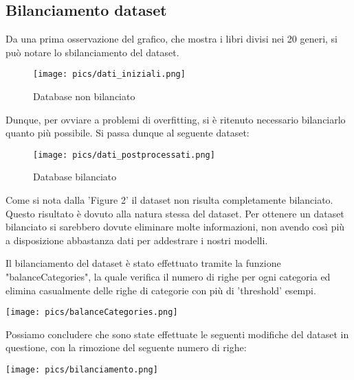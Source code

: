 \documentclass[12pt,oneside]{article}
\begin{document}
    \newpage
    \begin{enumerate}
    \subsection{Bilanciamento dataset}\label{bil}
    \begin{justify}
    Da una prima osservazione del grafico, che mostra i libri divisi nei 20 generi, si può notare lo sbilanciamento del dataset. 
    \end{justify}
    
    \begin{figure}[H]
    \texttt{[image: pics/dati\_iniziali.png]}
    \caption{Database non bilanciato}
    \end{figure}
    
    \begin{justify}
    Dunque, per ovviare a problemi di overfitting, si è ritenuto necessario bilanciarlo quanto più possibile. Si passa dunque al seguente dataset:
    \end{justify}
    
    \begin{figure}[H]
    \texttt{[image: pics/dati\_postprocessati.png]}
    \caption{Database bilanciato}
    \end{figure}
    
    \begin{justify}
    Come si nota dalla 'Figure 2' il dataset non risulta completamente bilanciato. Questo risultato è dovuto alla natura stessa del dataset. Per ottenere un dataset bilanciato si sarebbero dovute eliminare molte informazioni, non avendo così più a disposizione abbastanza dati per addestrare i nostri modelli.\\
    \end{justify}
    
    \begin{justify}
    Il bilanciamento del dataset è stato effettuato tramite la funzione "balanceCategories", la quale verifica il numero di righe per ogni categoria ed elimina casualmente delle righe di categorie con più di 'threshold' esempi.
    \end{justify}
    \texttt{[image: pics/balanceCategories.png]}
    

    \begin{minipage}[t]{0.40\textwidth}
    \vspace{30pt}
    Possiamo concludere che sono state effettuate le seguenti modifiche del dataset in questione, con la rimozione del seguente numero di righe:
    \end{minipage}
    \hfill
    \begin{minipage}[t]{0.50\textwidth}
    \vspace{20pt}
    \texttt{[image: pics/bilanciamento.png]}
    \end{minipage}
    \end{enumerate}
\end{document}
